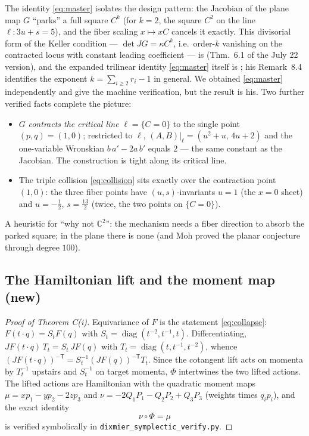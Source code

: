 \documentclass[11pt]{amsart}
\newcommand{\CC}{\mathbb{C}}
\theoremstyle{plain}
\theoremstyle{definition}
\theoremstyle{remark}
\begin{document}
The identity \eqref{eq:master} isolates the design pattern: the Jacobian
of the plane map $G$ ``parks'' a full square $C^{k}$ (for $k=2$, the
square $C^{2}$ on the line $\ell:3u+s=5$), and the fiber scaling
$x\mapsto xC$ cancels it exactly. This divisorial form of the Keller
condition --- $\det JG=\kappa C^{k}$, i.e.\ order-$k$ vanishing on the
contracted locus with constant leading coefficient --- is
\cite[Thm.~7.1]{Shaska26} (Thm.~6.1 of the July 22 version), and the
expanded trilinear identity \eqref{eq:master} itself is
\cite[Thm.~8.3]{Shaska26}; his Remark~8.4 identifies the exponent
$k=\sum_{i\ge2}r_{i}-1$ in general. We obtained \eqref{eq:master}
independently and give the machine verification, but the result is his.
Two further verified facts complete the picture:
\begin{itemize}
\item $G$ \emph{contracts the critical line} $\ell=\{C=0\}$ to the single
point $(p,q)=(1,0)$; restricted to $\ell$,
$(A,B)|_{\ell}=(u^{2}+u,\,4u+2)$ and the one-variable Wronskian
$b\,a'-2a\,b'$ equals $2$ --- the same constant as the Jacobian. The
construction is tight along its critical line.
\item The triple collision \eqref{eq:collision} sits exactly over the
contraction point $(1,0)$: the three fiber points have
$(u,s)$-invariants $u=1$ (the $x=0$ sheet) and $u=-\tfrac12$, $s=\tfrac{13}2$
(twice, the two points on $\{C=0\}$).
\end{itemize}
A heuristic for ``why not $\CC^{2}$'': the mechanism needs a fiber
direction to absorb the parked square; in the plane there is none (and
Moh \cite{Moh83} proved the planar conjecture through degree $100$).

\subsection{The Hamiltonian lift and the moment map (new)}\label{ssec:moment}

\begin{proof}[Proof of Theorem C(i)]
Equivariance of $F$ is the statement \eqref{eq:collapse}:
$F(t\cdot q)=S_{t}F(q)$ with $S_{t}=\operatorname{diag}(t^{-2},t^{-1},t)$.
Differentiating, $JF(t\cdot q)\,T_{t}=S_{t}\,JF(q)$ with
$T_{t}=\operatorname{diag}(t,t^{-1},t^{-2})$, whence
$(JF(t\cdot q))^{-\mathsf T}=S_{t}^{-1}(JF(q))^{-\mathsf T}T_{t}$. Since
the cotangent lift acts on momenta by $T_{t}^{-1}$ upstairs and
$S_{t}^{-1}$ on target momenta, $\Phi$ intertwines the two lifted actions.
The lifted actions are Hamiltonian with the quadratic moment maps
$\mu=xp_{1}-yp_{2}-2zp_{3}$ and $\nu=-2Q_{1}P_{1}-Q_{2}P_{2}+Q_{3}P_{3}$
(weights times $q_{i}p_{i}$), and the exact identity
\[
\nu\circ\Phi=\mu
\]
is verified symbolically in \texttt{dixmier\_symplectic\_verify.py}.
\end{proof}
\end{document}
